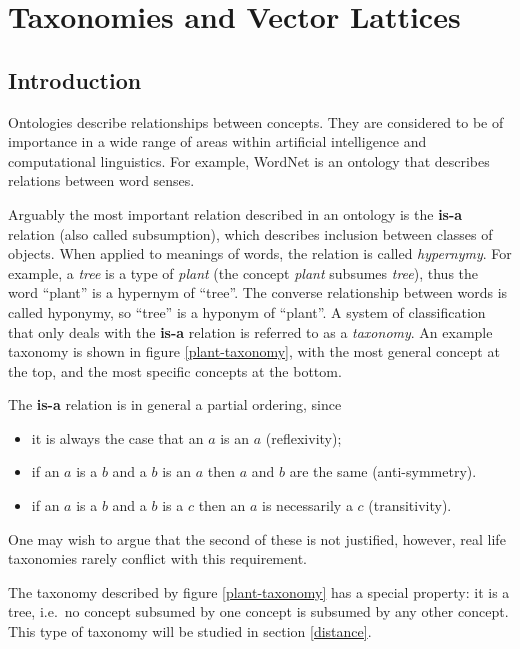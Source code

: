 \documentclass{report}
\begin{document}
 
 \chapter{Taxonomies and Vector Lattices}
 
 \section{Introduction}
 

Ontologies describe relationships between concepts. They are considered to be of importance in a wide range of areas within artificial intelligence and computational linguistics. For example, WordNet \citep{Fellbaum:98} is an ontology that describes relations between word senses.

Arguably the most important relation described in an ontology is the \textbf{is-a} relation (also called subsumption), which describes inclusion between classes of objects.  When applied to meanings of words, the relation is called \emph{hypernymy}. For example, a \emph{tree} is a type of \emph{plant} (the concept \emph{plant} subsumes \emph{tree}), thus the word ``plant'' is a hypernym of ``tree''. The converse relationship between words is called hyponymy, so ``tree'' is a hyponym of ``plant''. A system of classification that only deals with the \textbf{is-a} relation is referred to as a \emph{taxonomy}. An example taxonomy is shown in figure \ref{plant-taxonomy}, with the most general concept at the top, and the most specific concepts at the bottom.

The \textbf{is-a} relation is in general a partial ordering, since
\begin{itemize}
\item it is always the case that an $a$ is an $a$ (reflexivity);
\item if an $a$ is a $b$ and a $b$ is an $a$ then $a$ and $b$ are the same (anti-symmetry).
\item if an $a$ is a $b$ and a $b$ is a $c$ then an $a$ is necessarily a $c$ (transitivity).
\end{itemize}
One may wish to argue that the second of these is not justified, however, real life taxonomies rarely conflict with this requirement.

The taxonomy described by figure \ref{plant-taxonomy} has a special property: it is a tree, i.e.~no concept subsumed by one concept is subsumed by any other concept. This type of taxonomy will be studied in section \ref{distance}.
\end{document}

